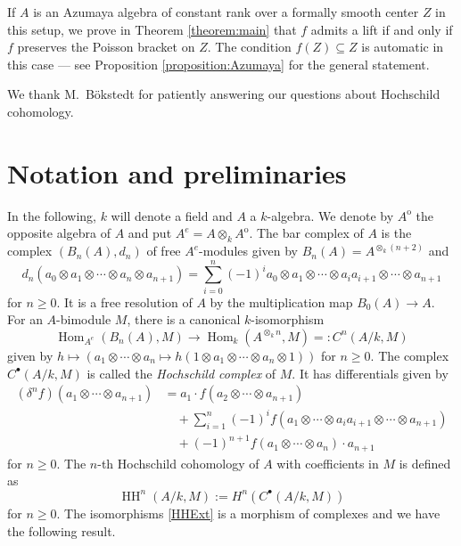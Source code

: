 \documentclass[a4paper,11pt,reqno]{amsart}%
\theoremstyle{definition}
\newcommand{\HH}{\operatorname{HH}}
\newcommand{\Hom}{\operatorname{Hom}}
\newcommand{\op}{{\operatorname{o}}}
\newcommand{\<}{\<}
\renewcommand{\>}{\>}
\numberwithin{equation}{subsection}
\begin{document}
If $A$ is an Azumaya algebra of constant rank over a formally smooth center $Z$ in this setup, we prove in Theorem \ref{theorem:main} that $f$ admits 
a lift if and only if $f$ preserves the Poisson bracket on $Z$. The condition $f(Z)\subseteq Z$ is automatic
in this case --- see Proposition \ref{proposition:Azumaya} for the general statement.

We thank M.~B\"okstedt for patiently answering our questions about Hochschild cohomology.



\section{Notation and preliminaries}

In the following, $k$ will denote a field and $A$ a $k$-algebra. 
We denote by $A^\op$ the opposite algebra of $A$
and put $A^e = A\otimes_k A^\op$. The bar complex of $A$ is the complex $(B_n(A), d_n)$ of 
free $A^e$-modules given by
$B_n(A) = A^{\otimes_k (n+2)}$ and
$$
d_n(a_0 \otimes a_1 \otimes \cdots \otimes a_n\otimes a_{n+1}) =
\sum_{i=0}^n (-1)^i a_0\otimes a_1 \otimes \cdots \otimes a_i a_{i+1} \otimes \cdots \otimes a_{n+1}
$$
for $n\geq 0$. It is a free resolution of $A$ by the multiplication map $B_0(A) \rightarrow A$. For an
$A$-bimodule $M$, there is a canonical $k$-isomorphism 
\begin{equation}\label{HHExt}
\Hom_{A^e}(B_n(A), M) \rightarrow  \Hom_k(A^{\otimes_k n}, M) =: C^n(A/k, M)
\end{equation}
given by $h\mapsto (a_1\otimes \cdots \otimes a_n \mapsto h(1\otimes a_1 \otimes \cdots \otimes a_n\otimes 1))$ for $n\geq 0$.
The complex $C^\bullet(A/k, M)$ is called 
the \emph{Hochschild complex} of $M$. It has differentials given by
\begin{align*}
(\delta^n f)(a_1 \otimes \cdots \otimes a_{n+1}) &= a_1 \cdot f(a_2 \otimes \cdots \otimes a_{n+1}) \\
&\quad + \sum_{i=1}^{n} (-1)^i f(a_1 \otimes \cdots \otimes a_i a_{i+1} \otimes \cdots \otimes a_{n+1}) \\
&\quad + (-1)^{n+1} f(a_1 \otimes \cdots \otimes a_n) \cdot a_{n+1}
\end{align*}
for $n\geq 0$.
The $n$-th Hochschild cohomology of $A$ with coefficients in $M$ is defined as
$$
\HH^n(A/k,M) := H^n(C^\bullet(A/k,M))
$$
for $n \geq 0$. The isomorphisms \eqref{HHExt} is a morphism of complexes and we have the following result.
\end{document}
